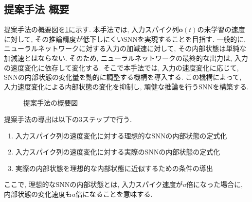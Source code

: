\subsection{提案手法 概要}
提案手法の概要図を\ref{fig:proposed_method}に示す.
本手法では, 入力スパイク列$\bm{o}(t)$の未学習の速度に対して, その推論精度が低下しにくいSNNを実現することを目指す.
一般的に, ニューラルネットワークに対する入力の加減速に対して, その内部状態は単純な加減速とはならない.
そのため, ニューラルネットワークの最終的な出力は, 入力の速度変化に依存して変化する.
そこで本手法では, 入力の速度変化に応じて, SNNの内部状態の変化量を動的に調整する機構を導入する.
この機構によって, 入力速度変化による内部状態の変化を抑制し, 頑健な推論を行うSNNを構築する.

\begin{figure}[htbp]
    \centering
    
    \caption{提案手法の概要図}
    \label{fig:proposed_method}
\end{figure}

提案手法の導出は以下の3ステップで行う.
\begin{enumerate}
    \item 入力スパイク列の速度変化に対する理想的なSNNの内部状態の定式化
    \item 入力スパイク列の速度変化に対する実際のSNNの内部状態の定式化
    \item 実際の内部状態を理想的な内部状態に近似するための条件の導出
\end{enumerate}
ここで, 理想的なSNNの内部状態とは, 入力スパイク速度が$a$倍になった場合に, 内部状態の変化速度も$a$倍になることを意味する.

